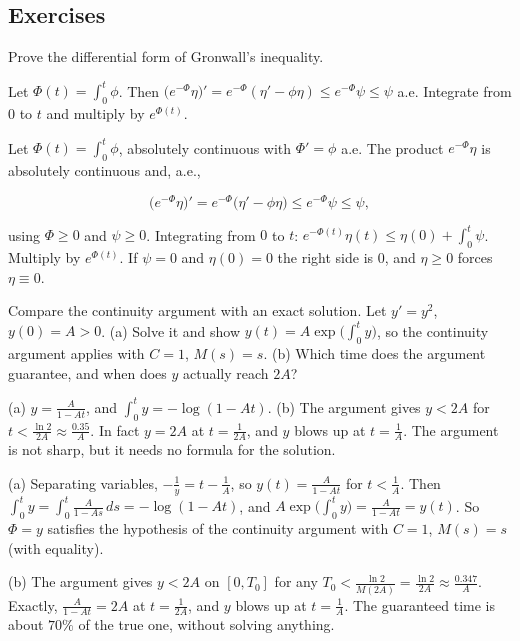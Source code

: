 \subsection*{Exercises}

\begin{exercise}
  Prove the differential form of Gronwall's inequality.
  \begin{hint}
    Let $\Phi(t) = \int_0^t \phi$. Then $\big(e^{-\Phi}\eta\big)' = e^{-\Phi}(\eta' - \phi\eta) \le e^{-\Phi}\psi \le \psi$ a.e. Integrate from $0$ to $t$ and multiply by $e^{\Phi(t)}$.
  \end{hint}
  \begin{solution}
    Let $\Phi(t) = \int_0^t\phi$, absolutely continuous with $\Phi' = \phi$ a.e. The product $e^{-\Phi}\eta$ is absolutely continuous and, a.e.,

    \[ \big(e^{-\Phi}\eta\big)' = e^{-\Phi}\big(\eta' - \phi\eta\big) \le e^{-\Phi}\psi \le \psi, \]

    using $\Phi \ge 0$ and $\psi \ge 0$. Integrating from $0$ to $t$: $e^{-\Phi(t)}\eta(t) \le \eta(0) + \int_0^t\psi$. Multiply by $e^{\Phi(t)}$. If $\psi = 0$ and $\eta(0) = 0$ the right side is $0$, and $\eta \ge 0$ forces $\eta \equiv 0$.
  \end{solution}
\end{exercise}

\begin{exercise}
  Compare the continuity argument with an exact solution. Let $y' = y^2$, $y(0) = A > 0$. (a) Solve it and show $y(t) = A\exp\big(\int_0^t y\big)$, so the continuity argument applies with $C = 1$, $M(s) = s$. (b) Which time does the argument guarantee, and when does $y$ actually reach $2A$?
  \begin{hint}
    (a) $y = \frac{A}{1 - At}$, and $\int_0^t y = -\log(1 - At)$. (b) The argument gives $y < 2A$ for $t < \frac{\ln 2}{2A} \approx \frac{0.35}{A}$. In fact $y = 2A$ at $t = \frac{1}{2A}$, and $y$ blows up at $t = \frac1A$. The argument is not sharp, but it needs no formula for the solution.
  \end{hint}
  \begin{solution}
    (a) Separating variables, $-\frac1y = t - \frac1A$, so $y(t) = \frac{A}{1 - At}$ for $t < \frac1A$. Then $\int_0^t y = \int_0^t\frac{A}{1-As}\,ds = -\log(1 - At)$, and $A\exp\big(\int_0^ty\big) = \frac{A}{1-At} = y(t)$. So $\Phi = y$ satisfies the hypothesis of the continuity argument with $C = 1$, $M(s) = s$ (with equality).

    (b) The argument gives $y < 2A$ on $[0, T_0]$ for any $T_0 < \frac{\ln 2}{M(2A)} = \frac{\ln 2}{2A} \approx \frac{0.347}{A}$. Exactly, $\frac{A}{1-At} = 2A$ at $t = \frac{1}{2A}$, and $y$ blows up at $t = \frac1A$. The guaranteed time is about $70\%$ of the true one, without solving anything.
  \end{solution}
\end{exercise}

